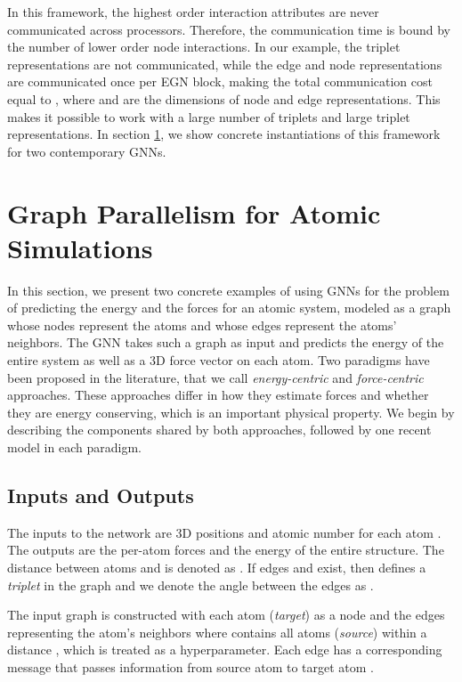 \documentclass{article} \usepackage{iclr2022_conference,times}
\begin{document}
In this framework, the highest order interaction attributes are never communicated across processors. Therefore, the communication time is bound by the number of lower order node interactions. In our example, the triplet representations are not communicated, while the edge and node representations are communicated once per EGN block, making the total communication cost equal to , where  and  are the dimensions of node and edge representations. This makes it possible to work with a large number of triplets and large triplet representations. In section \ref{sec:gp_atoms}, we show concrete instantiations of this framework for two contemporary GNNs.





\section{Graph Parallelism for Atomic Simulations} \label{sec:gp_atoms}

In this section, we present two concrete examples of using GNNs for the problem of predicting the energy and the forces for an atomic system, modeled as a graph whose nodes represent the atoms and whose edges represent the atoms' neighbors. The GNN takes such a graph as input and predicts the energy of the entire system as well as a 3D force vector on each atom. Two paradigms have been proposed in the literature, that we call \emph{energy-centric} and \emph{force-centric} approaches. These approaches differ in how they estimate forces and whether they are energy conserving, which is an important physical property. We begin by describing the components shared by both approaches, followed by one recent model in each paradigm.

\subsection{Inputs and Outputs}

The inputs to the network are 3D positions  and atomic number  for each atom .
The outputs are the per-atom forces  and the energy  of the entire structure. The distance between atoms  and  is denoted as . If edges  and  exist, then  defines a \emph{triplet} in the graph and we denote the angle between the edges as .

The input graph is constructed with each atom  (\emph{target}) as a node and the edges representing the atom's neighbors  where  contains all atoms  (\emph{source}) within a distance , which is treated as a hyperparameter. Each edge has a corresponding message  that passes information from source atom  to target atom .
\end{document}

